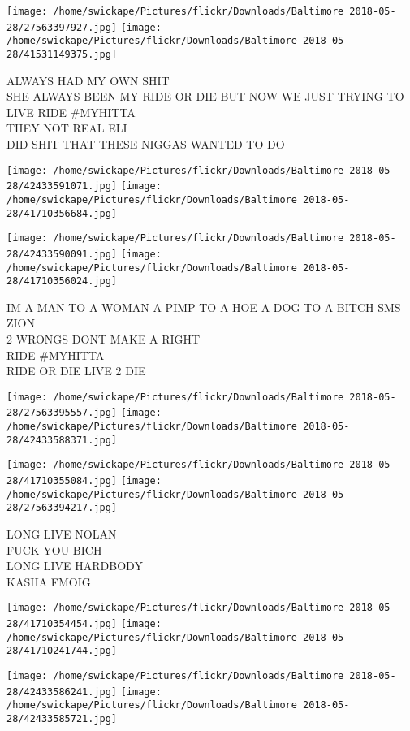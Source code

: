 \documentclass[10pt,letterpaper]{article}
\begin{document}
\texttt{[image: /home/swickape/Pictures/flickr/Downloads/Baltimore 2018-05-28/27563397927.jpg]}
\texttt{[image: /home/swickape/Pictures/flickr/Downloads/Baltimore 2018-05-28/41531149375.jpg]}

ALWAYS HAD MY OWN SHIT\\
SHE ALWAYS BEEN MY RIDE OR DIE BUT NOW WE JUST TRYING TO LIVE RIDE \#MYHITTA\\
THEY NOT REAL ELI\\
DID SHIT THAT THESE NIGGAS WANTED TO DO\\
\pagebreak

\texttt{[image: /home/swickape/Pictures/flickr/Downloads/Baltimore 2018-05-28/42433591071.jpg]}
\texttt{[image: /home/swickape/Pictures/flickr/Downloads/Baltimore 2018-05-28/41710356684.jpg]}

\texttt{[image: /home/swickape/Pictures/flickr/Downloads/Baltimore 2018-05-28/42433590091.jpg]}
\texttt{[image: /home/swickape/Pictures/flickr/Downloads/Baltimore 2018-05-28/41710356024.jpg]}

IM A MAN TO A WOMAN A PIMP TO A HOE A DOG TO A BITCH SMS ZION\\
2 WRONGS DONT MAKE A RIGHT\\
RIDE \#MYHITTA\\
RIDE OR DIE LIVE 2 DIE\\
\pagebreak

\texttt{[image: /home/swickape/Pictures/flickr/Downloads/Baltimore 2018-05-28/27563395557.jpg]}
\texttt{[image: /home/swickape/Pictures/flickr/Downloads/Baltimore 2018-05-28/42433588371.jpg]}

\texttt{[image: /home/swickape/Pictures/flickr/Downloads/Baltimore 2018-05-28/41710355084.jpg]}
\texttt{[image: /home/swickape/Pictures/flickr/Downloads/Baltimore 2018-05-28/27563394217.jpg]}

LONG LIVE NOLAN\\
FUCK YOU BICH\\
LONG LIVE HARDBODY\\
KASHA FMOIG\\
\pagebreak

\texttt{[image: /home/swickape/Pictures/flickr/Downloads/Baltimore 2018-05-28/41710354454.jpg]}
\texttt{[image: /home/swickape/Pictures/flickr/Downloads/Baltimore 2018-05-28/41710241744.jpg]}

\texttt{[image: /home/swickape/Pictures/flickr/Downloads/Baltimore 2018-05-28/42433586241.jpg]}
\texttt{[image: /home/swickape/Pictures/flickr/Downloads/Baltimore 2018-05-28/42433585721.jpg]}
\end{document}
